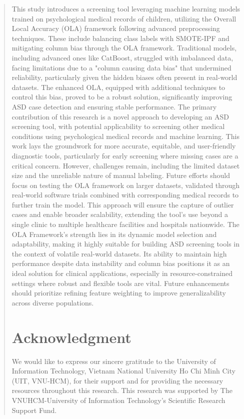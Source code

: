 \documentclass[runningheads]{llncs}
\begin{document}
\begin{abstract}
This study introduces a screening tool leveraging machine learning models trained on psychological medical records of children, utilizing the Overall Local Accuracy (OLA) framework following advanced preprocessing techniques. These include balancing class labels with SMOTE-IPF and mitigating column bias through the OLA framework. Traditional models, including advanced ones like CatBoost, struggled with imbalanced data, facing limitations due to a "column causing data bias" that undermined reliability, particularly given the hidden biases often present in real-world datasets. The enhanced OLA, equipped with additional techniques to control this bias, proved to be a robust solution, significantly improving ASD case detection and ensuring stable performance.
The primary contribution of this research is a novel approach to developing an ASD screening tool, with potential applicability to screening other medical conditions using psychological medical records and machine learning. This work lays the groundwork for more accurate, equitable, and user-friendly diagnostic tools, particularly for early screening where missing cases are a critical concern. However, challenges remain, including the limited dataset size and the unreliable nature of manual labeling. Future efforts should focus on testing the OLA framework on larger datasets, validated through real-world software trials combined with corresponding medical records to further train the model. This approach will ensure the capture of outlier cases and enable broader scalability, extending the tool’s use beyond a single clinic to multiple healthcare facilities and hospitals nationwide. The OLA Framework’s strength lies in its dynamic model selection and adaptability, making it highly suitable for building ASD screening tools in the context of volatile real-world datasets. Its ability to maintain high performance despite data instability and column bias positions it as an ideal solution for clinical applications, especially in resource-constrained settings where robust and flexible tools are vital. Future enhancements should prioritize refining feature weighting to improve generalizability across diverse populations.

\section{Acknowledgment}
We would like to express our sincere gratitude to the University of Information Technology, Vietnam National University Ho Chi Minh City (UIT, VNU-HCM), for their support and for providing the necessary resources throughout this research. This research was supported by The VNUHCM-University of Information Technology’s Scientific Research Support Fund.\\


\end{abstract}
\end{document}

